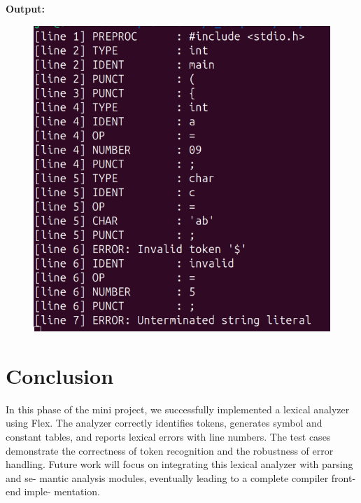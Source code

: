 \documentclass[12pt,a4paper]{article}
\begin{document}
\textbf{Output:}
\begin{figure}[H]
    \centering
    \includegraphics[width=0.9\linewidth]{errors.png}
\end{figure}
\vspace{0.5cm}

\section{Conclusion}
In this phase of the mini project, we successfully implemented a lexical analyzer using Flex. The analyzer correctly identifies tokens, generates symbol and constant
tables, and reports lexical errors with line numbers. The test cases demonstrate the
correctness of token recognition and the robustness of error handling.
Future work will focus on integrating this lexical analyzer with parsing and se-
mantic analysis modules, eventually leading to a complete compiler front-end imple-
mentation.
\end{document}
